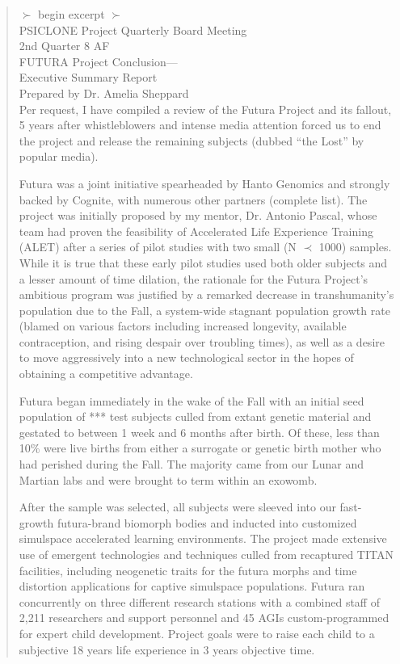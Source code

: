 \begin{quotation} $\succ$ begin excerpt $\succ$ \\ PSICLONE Project Quarterly Board Meeting \\ 2nd Quarter 8 AF \\ FUTURA Project Conclusion— \\ Executive Summary Report \\ Prepared by Dr. Amelia Sheppard	\\ Per request, I have compiled a review of the Futura Project and its fallout, 5 years after whistleblowers and intense media attention forced us to end the project and release the remaining subjects (dubbed “the Lost” by popular media). 

Futura was a joint initiative spearheaded by Hanto Genomics and strongly backed by Cognite, with numerous other partners (complete list). The project was initially proposed by my mentor, Dr. Antonio Pascal, whose team had proven the feasibility of Accelerated Life Experience Training (ALET) after a series of pilot studies with two small (N $ \prec $ 1000) samples. While it is true that these early pilot studies used both older subjects and a lesser amount of time dilation, the rationale for the Futura Project’s ambitious program was justified by a remarked decrease in transhumanity’s population due to the Fall, a system-wide stagnant population growth rate (blamed on various factors including increased longevity, available contraception, and rising despair over troubling times), as well as a desire to move aggressively into a new technological sector in the hopes of obtaining a competitive advantage. 

Futura began immediately in the wake of the Fall with an initial seed population of *** test subjects culled from extant genetic material and gestated to between 1 week and 6 months after birth. Of these, less than 10\% were live births from either a surrogate or genetic birth mother who had perished during the Fall. The majority came from our Lunar and Martian labs and were brought to term within an exowomb. 

After the sample was selected, all subjects were sleeved into our fast-growth futura-brand biomorph bodies and inducted into customized simulspace accelerated learning environments. The project made extensive use of emergent technologies and techniques culled from recaptured TITAN facilities, including neogenetic traits for the futura morphs and time distortion applications for captive simulspace populations. Futura ran concurrently on three different research stations with a combined staff of 2,211 researchers and support personnel and 45 AGIs custom-programmed for expert child development. Project goals were to raise each child to a subjective 18 years life experience in 3 years objective time. 


\end{quotation}
